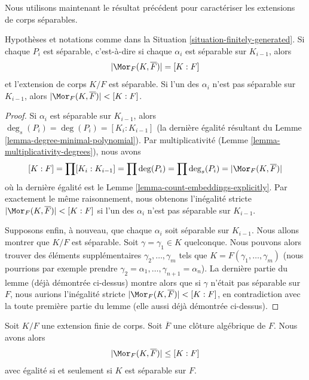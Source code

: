 \noindent
Nous utilisons maintenant le résultat précédent pour caractériser les extensions de corps séparables.

\begin{lemma}
\label{lemma-separably-generated-separable}
Hypothèses et notations comme dans la Situation \ref{situation-finitely-generated}.
Si chaque $P_i$ est séparable, c'est-à-dire si chaque $\alpha_i$ est séparable sur
$K_{i - 1}$, alors
$$
|\Mor_F(K, \overline{F})| = [K : F]
$$
et l'extension de corps $K/F$ est séparable. Si l'un des $\alpha_i$ n'est
pas séparable sur $K_{i - 1}$, alors
$|\Mor_F(K, \overline{F})| < [K : F]$.
\end{lemma}

\begin{proof}
Si $\alpha_i$ est séparable sur $K_{i - 1}$, alors
$\deg_s(P_i) = \deg(P_i) = [K_i : K_{i - 1}]$
(la dernière égalité résultant du Lemme \ref{lemma-degree-minimal-polynomial}).
Par multiplicativité (Lemme \ref{lemma-multiplicativity-degrees}), nous avons
$$
[K : F] = \prod [K_i : K_{i - 1}] = \prod \deg(P_i) =
\prod \deg_s(P_i) = |\Mor_F(K, \overline{F})|
$$
où la dernière égalité est le Lemme \ref{lemma-count-embeddings-explicitly}.
Par exactement le même raisonnement, nous obtenons l'inégalité stricte
$|\Mor_F(K, \overline{F})| < [K : F]$ si l'un des $\alpha_i$ n'est
pas séparable sur $K_{i - 1}$.

\medskip\noindent
Supposons enfin, à nouveau, que chaque $\alpha_i$ soit séparable sur $K_{i - 1}$.
Nous allons montrer que $K/F$ est séparable.
Soit $\gamma = \gamma_1 \in K$ quelconque. Nous pouvons alors trouver des éléments supplémentaires
$\gamma_2, \ldots, \gamma_m$ tels que
$K = F(\gamma_1, \ldots, \gamma_m)$ (nous pourrions par exemple prendre
$\gamma_2 = \alpha_1, \ldots, \gamma_{n + 1} = \alpha_n$).
La dernière partie du lemme (déjà démontrée ci-dessus) montre alors
que si $\gamma$ n'était pas séparable sur $F$, nous aurions l'inégalité
stricte $|\Mor_F(K, \overline{F})| < [K : F]$,
en contradiction avec la toute première partie du lemme (elle aussi déjà démontrée
ci-dessus).
\end{proof}

\begin{lemma}
\label{lemma-separable-equality}
Soit $K/F$ une extension finie de corps. Soit $\overline{F}$ une
clôture algébrique de $F$. Nous avons alors
$$
|\Mor_F(K, \overline{F})| \leq [K : F]
$$
avec égalité si et seulement si $K$ est séparable sur $F$.
\end{lemma}

